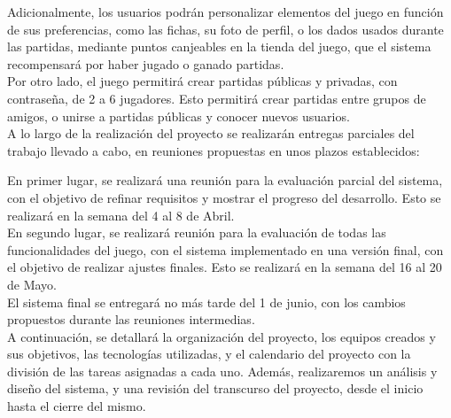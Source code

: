 \documentclass[11pt, a4paper, titlepage]{article}
\begin{document}
Adicionalmente, los usuarios podrán personalizar elementos del juego en función de sus preferencias, como las fichas, su foto de perfil, o los dados usados durante las partidas, mediante puntos canjeables en la tienda del juego, que el sistema recompensará por haber jugado o ganado partidas. \\

Por otro lado, el juego permitirá crear partidas públicas y privadas, con contraseña, de 2 a 6 jugadores. Esto permitirá crear partidas entre grupos de amigos, o unirse a partidas públicas y conocer nuevos usuarios.\\


A lo largo de la realización del proyecto se realizarán entregas parciales del trabajo llevado a cabo, en reuniones propuestas en unos plazos establecidos:

En primer lugar, se realizará una reunión para la evaluación parcial del sistema, con el objetivo de refinar requisitos y mostrar el progreso del desarrollo. Esto se realizará en la semana del 4 al 8 de Abril. \\

En segundo lugar, se realizará reunión para la evaluación de todas las funcionalidades del juego, con el sistema implementado en una versión final, con el objetivo de realizar ajustes finales. Esto se realizará en la semana del 16 al 20 de Mayo. \\

El sistema final se entregará no más tarde del 1 de junio, con los cambios propuestos durante las reuniones intermedias. \\

A continuación, se detallará la organización del proyecto, los equipos creados y sus objetivos, las tecnologías utilizadas,  y el calendario del proyecto con la división de las tareas asignadas a cada uno.
Además, realizaremos un análisis y diseño del sistema, y una revisión del transcurso del proyecto, desde el inicio hasta el cierre del mismo. \newpage
\end{document}

